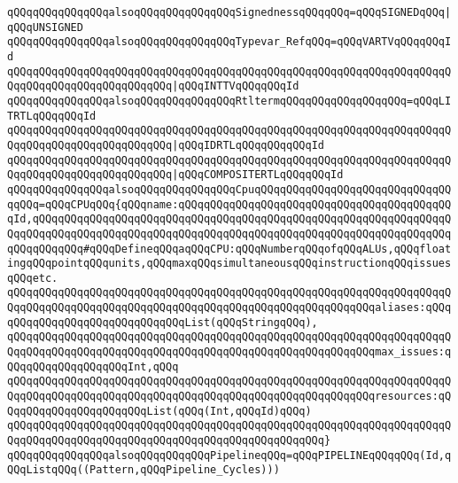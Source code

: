 \verb|qQQqqQQqqQQqqQQqalsoqQQqqQQqqQQqqQQqSignednessqQQqqQQq=qQQqSIGNEDqQQq|\verb#|qQQqUNSIGNED#\newline
\newline
\verb|qQQqqQQqqQQqqQQqalsoqQQqqQQqqQQqqQQqTypevar_RefqQQq=qQQqVARTVqQQqqQQqId|\newline
\verb|qQQqqQQqqQQqqQQqqQQqqQQqqQQqqQQqqQQqqQQqqQQqqQQqqQQqqQQqqQQqqQQqqQQqqQQqqQQqqQQqqQQqqQQqqQQqqQQq|\verb#|qQQqINTTVqQQqqQQqId#\newline
\newline
\verb|qQQqqQQqqQQqqQQqalsoqQQqqQQqqQQqqQQqRtltermqQQqqQQqqQQqqQQqqQQq=qQQqLITRTLqQQqqQQqId|\newline
\verb|qQQqqQQqqQQqqQQqqQQqqQQqqQQqqQQqqQQqqQQqqQQqqQQqqQQqqQQqqQQqqQQqqQQqqQQqqQQqqQQqqQQqqQQqqQQqqQQq|\verb#|qQQqIDRTLqQQqqQQqqQQqId#\newline
\verb|qQQqqQQqqQQqqQQqqQQqqQQqqQQqqQQqqQQqqQQqqQQqqQQqqQQqqQQqqQQqqQQqqQQqqQQqqQQqqQQqqQQqqQQqqQQqqQQq|\verb#|qQQqCOMPOSITERTLqQQqqQQqId#\newline
\newline
\verb|qQQqqQQqqQQqqQQqalsoqQQqqQQqqQQqqQQqCpuqQQqqQQqqQQqqQQqqQQqqQQqqQQqqQQqqQQq=qQQqCPUqQQq{qQQqname:qQQqqQQqqQQqqQQqqQQqqQQqqQQqqQQqqQQqqQQqqQQqId,qQQqqQQqqQQqqQQqqQQqqQQqqQQqqQQqqQQqqQQqqQQqqQQqqQQqqQQqqQQqqQQqqQQqqQQqqQQqqQQqqQQqqQQqqQQqqQQqqQQqqQQqqQQqqQQqqQQqqQQqqQQqqQQqqQQqqQQqqQQqqQQqqQQq#qQQqDefineqQQqaqQQqCPU:qQQqNumberqQQqofqQQqALUs,qQQqfloatingqQQqpointqQQqunits,qQQqmaxqQQqsimultaneousqQQqinstructionqQQqissuesqQQqetc.|\newline
\verb|qQQqqQQqqQQqqQQqqQQqqQQqqQQqqQQqqQQqqQQqqQQqqQQqqQQqqQQqqQQqqQQqqQQqqQQqqQQqqQQqqQQqqQQqqQQqqQQqqQQqqQQqqQQqqQQqqQQqqQQqqQQqqQQqaliases:qQQqqQQqqQQqqQQqqQQqqQQqqQQqqQQqList(qQQqStringqQQq),|\newline
\verb|qQQqqQQqqQQqqQQqqQQqqQQqqQQqqQQqqQQqqQQqqQQqqQQqqQQqqQQqqQQqqQQqqQQqqQQqqQQqqQQqqQQqqQQqqQQqqQQqqQQqqQQqqQQqqQQqqQQqqQQqqQQqqQQqmax_issues:qQQqqQQqqQQqqQQqqQQqInt,qQQq|\newline
\verb|qQQqqQQqqQQqqQQqqQQqqQQqqQQqqQQqqQQqqQQqqQQqqQQqqQQqqQQqqQQqqQQqqQQqqQQqqQQqqQQqqQQqqQQqqQQqqQQqqQQqqQQqqQQqqQQqqQQqqQQqqQQqqQQqresources:qQQqqQQqqQQqqQQqqQQqqQQqList(qQQq(Int,qQQqId)qQQq)|\newline
\verb|qQQqqQQqqQQqqQQqqQQqqQQqqQQqqQQqqQQqqQQqqQQqqQQqqQQqqQQqqQQqqQQqqQQqqQQqqQQqqQQqqQQqqQQqqQQqqQQqqQQqqQQqqQQqqQQqqQQqqQQq}|\newline
\newline
\verb|qQQqqQQqqQQqqQQqalsoqQQqqQQqqQQqPipelineqQQq=qQQqPIPELINEqQQqqQQq(Id,qQQqListqQQq((Pattern,qQQqPipeline_Cycles)))|\newline
